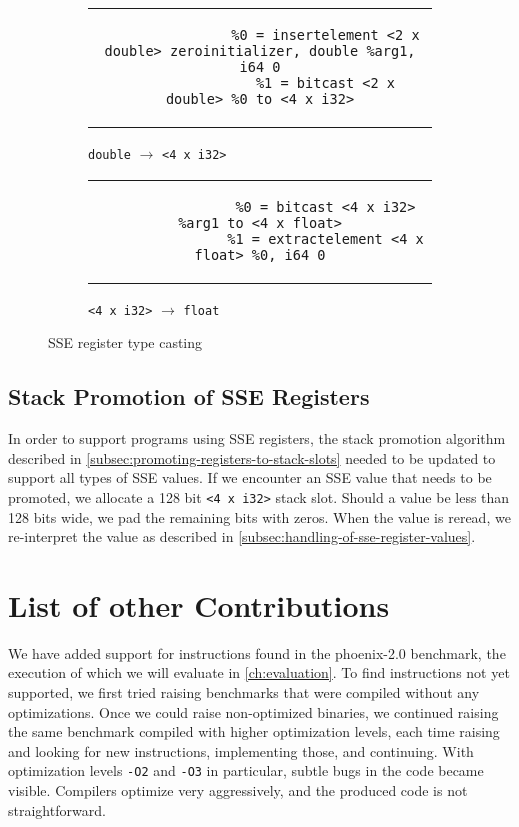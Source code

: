 \begin{figure}[htpb]
    \centering
    \begin{subfigure}{\textwidth}
        \begin{tabular}{c}
            \begin{lstlisting}
                %0 = insertelement <2 x double> zeroinitializer, double %arg1, i64 0
                %1 = bitcast <2 x double> %0 to <4 x i32>
            \end{lstlisting}
        \end{tabular}
        \caption{\texttt{double} $\rightarrow$ \texttt{<4 x i32>}}
    \end{subfigure}
    \hfill%
    \begin{subfigure}{\textwidth}
        \begin{tabular}{c}
            \begin{lstlisting}
                %0 = bitcast <4 x i32> %arg1 to <4 x float>
                %1 = extractelement <4 x float> %0, i64 0
            \end{lstlisting}
        \end{tabular}
        \caption{\texttt{<4 x i32>} $\rightarrow$ \texttt{float}}
    \end{subfigure}
    \caption{SSE register type casting}
    \label{fig:sse-reg-casting}
\end{figure}

\subsection{Stack Promotion of SSE Registers}\label{subsec:stack-promotion-of-sse-registers}

In order to support programs using SSE registers, the stack promotion algorithm described in \cref{subsec:promoting-registers-to-stack-slots} needed to be updated to support all types of SSE values.
If we encounter an SSE value that needs to be promoted, we allocate a 128 bit \texttt{<4 x i32>} stack slot.
Should a value be less than 128 bits wide, we pad the remaining bits with zeros.
When the value is reread, we re-interpret the value as described in \cref{subsec:handling-of-sse-register-values}.

\section{List of other Contributions}\label{sec:list-of-contributions}

We have added support for instructions found in the phoenix-2.0 benchmark, the execution of which we will evaluate in \cref{ch:evaluation}.
To find instructions not yet supported, we first tried raising benchmarks that were compiled without any optimizations.
Once we could raise non-optimized binaries, we continued raising the same benchmark compiled with higher optimization levels, each time raising and looking for new instructions, implementing those, and continuing.
With optimization levels \texttt{-O2} and \texttt{-O3} in particular, subtle bugs in the code became visible.
Compilers optimize very aggressively, and the produced code is not straightforward.


